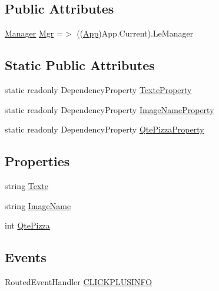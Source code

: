\subsection*{Public Attributes}
\begin{DoxyCompactItemize}
\item 
\hyperlink{classModele_1_1Manager}{Manager} \hyperlink{classnewPizza1_1_1ucPizzaBox_a236b692b1cd3447fc57d5ddfcbea57fc}{Mgr} =$>$ ((\hyperlink{classnewPizza1_1_1App}{App})App.\+Current).Le\+Manager
\end{DoxyCompactItemize}
\subsection*{Static Public Attributes}
\begin{DoxyCompactItemize}
\item 
static readonly Dependency\+Property \hyperlink{classnewPizza1_1_1ucPizzaBox_aa7fb40f23691738f213d713a9779a2a7}{Texte\+Property}
\item 
static readonly Dependency\+Property \hyperlink{classnewPizza1_1_1ucPizzaBox_ae9c0980514d512a7cacf9f03eaa4c185}{Image\+Name\+Property}
\item 
static readonly Dependency\+Property \hyperlink{classnewPizza1_1_1ucPizzaBox_aaedbc16f73a319f7fecbc98887446eda}{Qte\+Pizza\+Property}
\end{DoxyCompactItemize}
\subsection*{Properties}
\begin{DoxyCompactItemize}
\item 
string \hyperlink{classnewPizza1_1_1ucPizzaBox_adbe8d6438e92af19f0abd3d23f4e518a}{Texte}
\item 
string \hyperlink{classnewPizza1_1_1ucPizzaBox_a40fd226307aed4e7d0bf696213f81488}{Image\+Name}
\item 
int \hyperlink{classnewPizza1_1_1ucPizzaBox_add8024597e3f9cc5c5d30cbffc1e87ed}{Qte\+Pizza}
\end{DoxyCompactItemize}
\subsection*{Events}
\begin{DoxyCompactItemize}
\item 
Routed\+Event\+Handler \hyperlink{classnewPizza1_1_1ucPizzaBox_a1d65e99cfd9f280098f95cc8087493c0}{C\+L\+I\+C\+K\+P\+L\+U\+S\+I\+N\+FO}
\end{DoxyCompactItemize}



